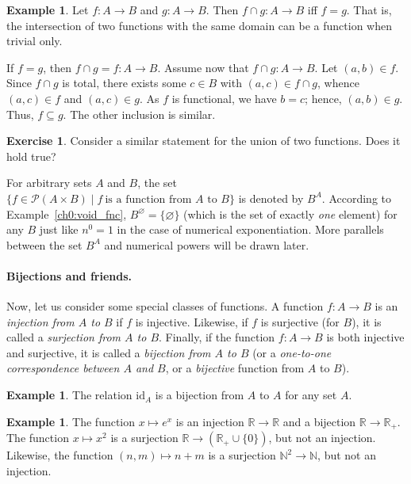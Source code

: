 \documentclass[12pt,notitlepage]{article}
\theoremstyle{plain}
\theoremstyle{definition}
\newtheorem{exc}[thm]{Exercise}
\newtheorem{exm}[thm]{Example}
\theoremstyle{plain}
\newcommand{\N}{\mathbb{N}}
\newcommand{\R}{\mathbb{R}}
\newcommand{\sbs}{\subseteq}
\newcommand{\void}{\varnothing}
\newcommand{\mP}{\mathcal{P}}
\newcommand{\id}{\mathrm{id}}
\newcommand{\1}{\mathbf{1}}
\newcommand{\0}{\mathbf{0}}
\begin{document}
\begin{exm}
Let $f\colon A \to B$ and $g\colon A \to B$. Then ${f \cap g}\colon A \to B$ iff $f = g$. That is, the intersection of two functions with the same domain can be a function when trivial only.

If $f = g$, then $f \cap g = f \colon A \to B$. Assume now that ${f \cap g}\colon A \to B$. Let $(a,b) \in f$. Since $f \cap g$ is total, there exists some $c \in B$ with $(a,c) \in f \cap g$, whence $(a,c) \in f$ and $(a,c) \in g$. As $f$ is functional, we have $b = c$; hence, $(a,b) \in g$. Thus, $f \sbs g$. The other inclusion is similar.
\end{exm}
 
\begin{exc}
Consider a similar statement for the union of two functions. Does it hold true?
\end{exc}

For arbitrary sets $A$ and $B$, the set $\{ f \in \mP(A \times B) \mid f\ \mbox{is a function from $A$ to $B$}\}$ is denoted by $B^A$. According to Example~\ref{ch0:void_fnc}, $B^\void = \{ \void \}$ (which is the set of exactly \emph{one} element) for any $B$ just like $n^0 = 1$ in the case of numerical exponentiation. More parallels between the set $B^A$ and numerical powers will be drawn later.

\paragraph{Bijections and friends.} Now, let us consider some special classes of functions. A function $f\colon A \to B$ is an \emph{injection from $A$ to $B$} if $f$ is injective. Likewise, if $f$ is surjective (for $B$), it is called a \emph{surjection from $A$ to $B$}. Finally, if the function $f\colon A \to B$ is both injective and surjective, it is called a \emph{bijection from $A$ to $B$} (or a \emph{one-to-one correspondence between $A$ and $B$}, or a \emph{bijective} function from $A$ to $B$).

\begin{exm}
The relation $\id_A$ is a bijection from $A$ to $A$ for any set $A$.
\end{exm}

\begin{exm}
The function $x \mapsto e^x$ is an injection $\R \to \R$ and a bijection $\R \to \R_+$. The function $x \mapsto x^2$ is a surjection $\R \to (\R_+ \cup \{0\})$, but not an injection. Likewise, the function $(n,m) \mapsto n + m$ is a surjection $\N^2 \to \N$, but not an injection. 
\end{exm}
\end{document}
